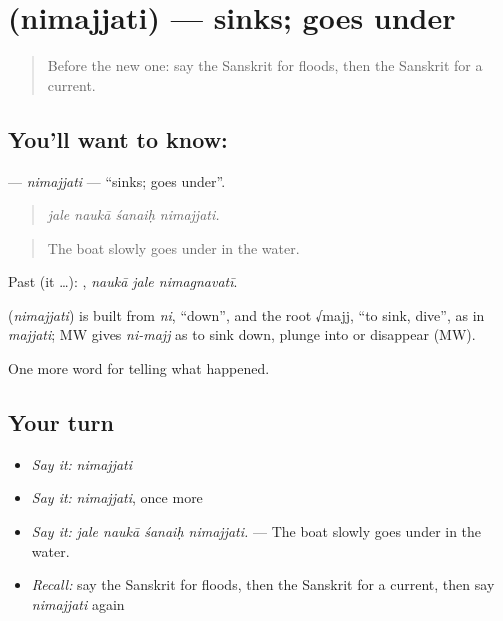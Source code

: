 \section[\texorpdfstring{\sk{निमज्जति} (nimajjati)}{निमज्जति (nimajjati)}]{ (nimajjati) — sinks; goes under}

\label{lesson:SA-C302-nimajjati}



\begin{quote}
Before the new one: say the Sanskrit for floods, then the Sanskrit for a current.
\end{quote}

\subsection*{You'll want to know: }
\textbf{} — \emph{nimajjati} — \textquotedblleft{}sinks; goes under\textquotedblright{}.

\begin{quote}
   
\end{quote}

\begin{quote}
\emph{jale naukā śanaiḥ nimajjati.}
\end{quote}

\begin{quote}
The boat slowly goes under in the water.
\end{quote}

Past (it …):   , \emph{naukā jale nimagnavatī}.

\begin{cousinweb}
\textbf{} (\emph{nimajjati}) is built from \emph{ni}, \textquotedblleft{}down\textquotedblright{}, and the root √majj, \textquotedblleft{}to sink, dive\textquotedblright{}, as in \emph{majjati}; MW gives \emph{ni-majj} as to sink down, plunge into or disappear (MW).
\end{cousinweb}

\begin{grammarlens}[title={What you've built}]
One more word for telling what happened.
\end{grammarlens}

\subsection*{Your turn}
\begin{itemize}
\raggedright
  \item \emph{Say it:} \emph{nimajjati}
  \item \emph{Say it:} \emph{nimajjati}, once more
  \item \emph{Say it:} \emph{jale naukā śanaiḥ nimajjati.} — The boat slowly goes under in the water.
  \item \emph{Recall:} say the Sanskrit for floods, then the Sanskrit for a current, then say \emph{nimajjati} again
\end{itemize}

